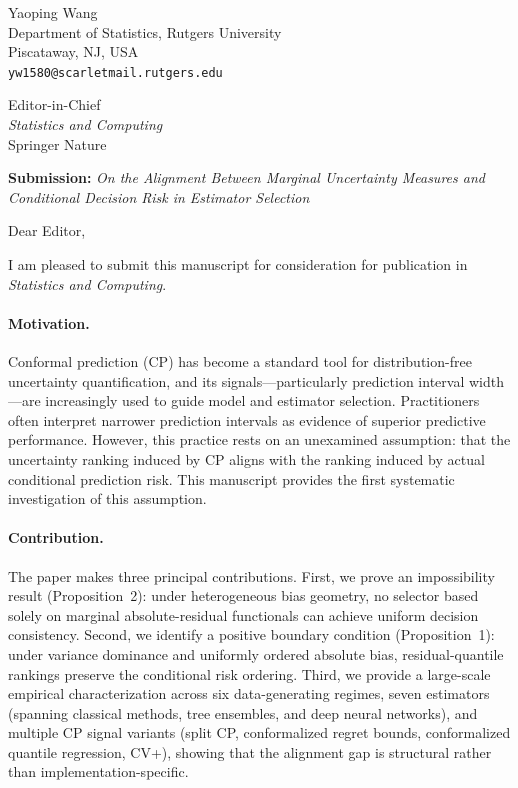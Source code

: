 \documentclass[a4paper,11pt]{article}
\begin{document}
\begin{flushright}
Yaoping Wang\\
Department of Statistics, Rutgers University\\
Piscataway, NJ, USA\\
\texttt{yw1580@scarletmail.rutgers.edu}\\
\end{flushright}

\vspace{2em}

\begin{flushleft}
Editor-in-Chief\\
\textit{Statistics and Computing}\\
Springer Nature\\
\end{flushleft}

\vspace{2em}

\textbf{Submission:} \textit{On the Alignment Between Marginal Uncertainty Measures and Conditional Decision Risk in Estimator Selection}

\vspace{1em}

Dear Editor,

I am pleased to submit this manuscript for consideration for publication in \textit{Statistics and Computing}.

\paragraph{Motivation.}
Conformal prediction (CP) has become a standard tool for distribution-free uncertainty quantification, and its signals---particularly prediction interval width---are increasingly used to guide model and estimator selection. Practitioners often interpret narrower prediction intervals as evidence of superior predictive performance. However, this practice rests on an unexamined assumption: that the uncertainty ranking induced by CP aligns with the ranking induced by actual conditional prediction risk. This manuscript provides the first systematic investigation of this assumption.

\paragraph{Contribution.}
The paper makes three principal contributions. First, we prove an impossibility result (Proposition~2): under heterogeneous bias geometry, no selector based solely on marginal absolute-residual functionals can achieve uniform decision consistency. Second, we identify a positive boundary condition (Proposition~1): under variance dominance and uniformly ordered absolute bias, residual-quantile rankings preserve the conditional risk ordering. Third, we provide a large-scale empirical characterization across six data-generating regimes, seven estimators (spanning classical methods, tree ensembles, and deep neural networks), and multiple CP signal variants (split CP, conformalized regret bounds, conformalized quantile regression, CV+), showing that the alignment gap is structural rather than implementation-specific.
\end{document}
